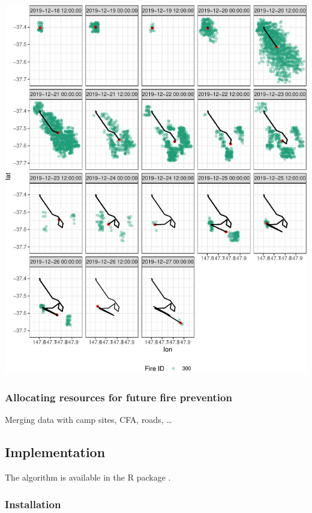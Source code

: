 \begin{Schunk}


\begin{center}\includegraphics[width=0.8\linewidth]{clustering_paper_files/figure-latex/unnamed-chunk-6-1} \end{center}

\end{Schunk}

\hypertarget{allocating-resources-for-future-fire-prevention}{%
\subsubsection{Allocating resources for future fire
prevention}\label{allocating-resources-for-future-fire-prevention}}

Merging data with camp sites, CFA, roads, \ldots{}

\hypertarget{implementation}{%
\subsection{Implementation}\label{implementation}}

The algorithm is available in the R package .

\hypertarget{installation}{%
\subsubsection{Installation}\label{installation}}

